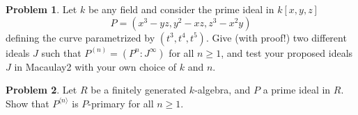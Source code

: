 \documentclass[11pt]{article}
\theoremstyle{definition}
\newtheorem{problem}{Problem}
\begin{document}
\begin{problem}
	Let $k$ be any field and consider the prime ideal in $k[x,y,z]$
	$$P = (x^3-yz,y^2-xz,z^3-x^2y)$$
	defining the curve parametrized by $(t^3, t^4, t^5)$. Give (with proof!) two different ideals $J$ such that $P^{(n)} = (P^n : J^\infty)$ for all $n \geqslant 1$, and test your proposed ideals $J$ in Macaulay2 with your own choice of $k$ and $n$.
\end{problem}


\begin{problem}
	Let $R$ be a finitely generated $k$-algebra, and $P$ a prime ideal in $R$. Show that $P^{\langle n\rangle}$ is $P$-primary for all $n \geqslant 1$.
\end{problem}
\end{document}
